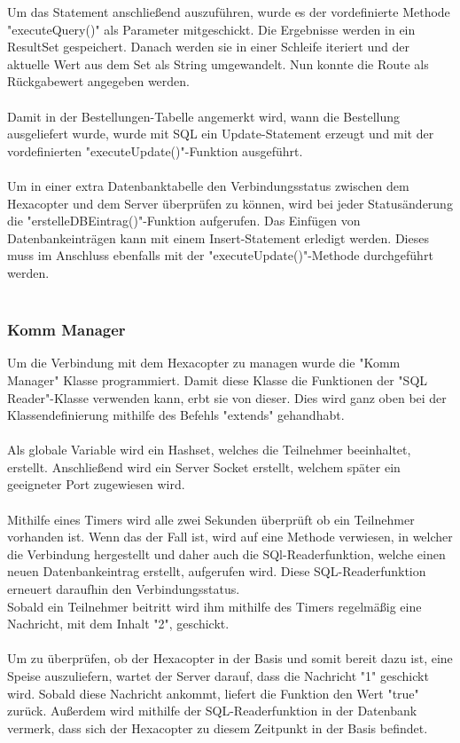 Um das Statement anschließend auszuführen, wurde es der vordefinierte Methode "executeQuery()" als Parameter mitgeschickt.
Die Ergebnisse werden in ein ResultSet gespeichert. Danach werden sie in einer Schleife iteriert und der aktuelle Wert aus dem Set als String umgewandelt. Nun konnte die Route als Rückgabewert angegeben werden.
\\ \\
Damit in der Bestellungen-Tabelle angemerkt wird, wann die Bestellung ausgeliefert wurde, wurde mit SQL ein Update-Statement erzeugt und mit der vordefinierten "executeUpdate()"-Funktion ausgeführt.
\\ \\
Um in einer extra Datenbanktabelle den Verbindungsstatus zwischen dem Hexacopter und dem Server überprüfen zu können, wird bei jeder Statusänderung die "erstelleDBEintrag()"-Funktion aufgerufen. Das Einfügen von Datenbankeinträgen kann mit einem Insert-Statement erledigt werden. Dieses muss im Anschluss ebenfalls mit der "executeUpdate()"-Methode durchgeführt werden.
\\ \\
\subsubsection*{Komm Manager}
Um die Verbindung mit dem Hexacopter zu managen wurde die "Komm Manager" Klasse programmiert.
Damit diese Klasse die Funktionen der "SQL Reader"-Klasse verwenden kann, erbt sie von dieser. Dies wird ganz oben bei der Klassendefinierung mithilfe des Befehls "extends" gehandhabt.
\\ \\
Als globale Variable wird ein Hashset, welches die Teilnehmer beeinhaltet, erstellt.
Anschließend wird ein Server Socket erstellt, welchem später ein geeigneter Port zugewiesen wird.
\\ \\
Mithilfe eines Timers wird alle zwei Sekunden überprüft ob ein Teilnehmer vorhanden ist. Wenn das der Fall ist, wird auf eine Methode verwiesen, in welcher die Verbindung hergestellt und daher auch die SQl-Readerfunktion, welche einen neuen Datenbankeintrag erstellt, aufgerufen wird. Diese SQL-Readerfunktion erneuert daraufhin den Verbindungsstatus.
\\
Sobald ein Teilnehmer beitritt wird ihm mithilfe des Timers regelmäßig eine Nachricht, mit dem Inhalt "2", geschickt.
\\ \\
Um zu überprüfen, ob der Hexacopter in der Basis und somit bereit dazu ist, eine Speise auszuliefern, wartet der Server darauf, dass die Nachricht "1" geschickt wird. Sobald diese Nachricht ankommt, liefert die Funktion den Wert "true" zurück. Außerdem wird mithilfe der SQL-Readerfunktion in der Datenbank vermerk, dass sich der Hexacopter zu diesem Zeitpunkt in der Basis befindet.
\\ \\
